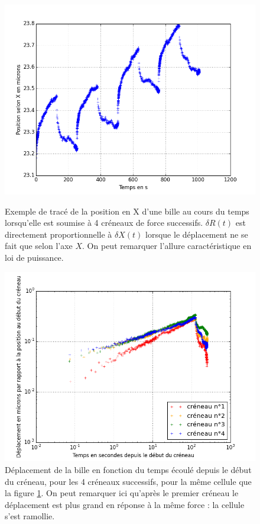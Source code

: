 \documentclass{report}
\begin{document}
\begin{figure}
\includegraphics[scale=0.5]{Figures/Exemple_C162_X_vs_slice.png}

\caption{Exemple de tracé de la position en X d'une bille au cours du temps lorsqu'elle est soumise à 4 créneaux de force successifs. $\delta R(t)$ est directement proportionnelle à $\delta X(t)$ lorsque le déplacement ne se fait que selon l'axe $X$. On peut remarquer l'allure caractéristique en loi de puissance.\label{Exemple}} 
	\includegraphics[scale=0.5]{Figures/Exemple_C162_loglog.png}
	\caption{Déplacement de la bille en fonction du temps écoulé depuis le début du créneau, pour les 4 créneaux successifs, pour la même cellule que la figure \ref{Exemple}. On peut remarquer ici qu'après le premier créneau le déplacement est plus grand en réponse à la même force : la cellule s'est ramollie. }
\end{figure}
\end{document}
